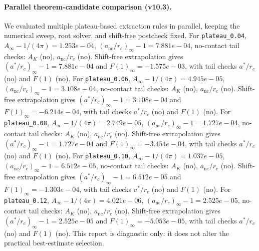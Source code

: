 \paragraph{Parallel theorem-candidate comparison (v10.3).}
We evaluated multiple plateau-based extraction rules in parallel, keeping the numerical sweep, root solver, and shift-free postcheck fixed. For \texttt{plateau_0.04}, $A_\infty-1/(4\pi)=1.253e-04$, $(a_{\mathrm{nc}}/r_c)_\infty-1=7.881e-04$, no-contact tail checks: $A_K$ (no), $a_{\mathrm{nc}}/r_c$ (no). Shift-free extrapolation gives $(a^*/r_c)_\infty-1=7.881e-04$ and $F(1)_\infty=-1.575e-03$, with tail checks $a^*/r_c$ (no) and $F(1)$ (no). For \texttt{plateau_0.06}, $A_\infty-1/(4\pi)=4.945e-05$, $(a_{\mathrm{nc}}/r_c)_\infty-1=3.108e-04$, no-contact tail checks: $A_K$ (no), $a_{\mathrm{nc}}/r_c$ (no). Shift-free extrapolation gives $(a^*/r_c)_\infty-1=3.108e-04$ and $F(1)_\infty=-6.214e-04$, with tail checks $a^*/r_c$ (no) and $F(1)$ (no). For \texttt{plateau_0.08}, $A_\infty-1/(4\pi)=2.749e-05$, $(a_{\mathrm{nc}}/r_c)_\infty-1=1.727e-04$, no-contact tail checks: $A_K$ (no), $a_{\mathrm{nc}}/r_c$ (no). Shift-free extrapolation gives $(a^*/r_c)_\infty-1=1.727e-04$ and $F(1)_\infty=-3.454e-04$, with tail checks $a^*/r_c$ (no) and $F(1)$ (no). For \texttt{plateau_0.10}, $A_\infty-1/(4\pi)=1.037e-05$, $(a_{\mathrm{nc}}/r_c)_\infty-1=6.512e-05$, no-contact tail checks: $A_K$ (no), $a_{\mathrm{nc}}/r_c$ (no). Shift-free extrapolation gives $(a^*/r_c)_\infty-1=6.512e-05$ and $F(1)_\infty=-1.303e-04$, with tail checks $a^*/r_c$ (no) and $F(1)$ (no). For \texttt{plateau_0.12}, $A_\infty-1/(4\pi)=4.021e-06$, $(a_{\mathrm{nc}}/r_c)_\infty-1=2.525e-05$, no-contact tail checks: $A_K$ (no), $a_{\mathrm{nc}}/r_c$ (no). Shift-free extrapolation gives $(a^*/r_c)_\infty-1=2.525e-05$ and $F(1)_\infty=-5.053e-05$, with tail checks $a^*/r_c$ (no) and $F(1)$ (no). This report is diagnostic only: it does not alter the practical best-estimate selection.
